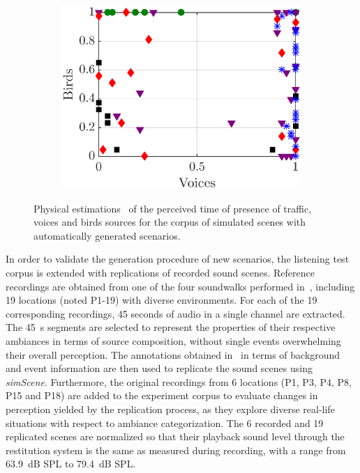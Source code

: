 \documentclass[twocolumn]{article}
\begin{document}
\begin{figure}[th]
\begin{subfigure}[t]{0.33\textwidth}
        \includegraphics[width=\textwidth]{figures/vb_pres.eps}
    \end{subfigure}
    \caption{Physical estimations~\cite{gontier2018} of the perceived time of presence of traffic, voices and birds sources for the corpus of simulated scenes with automatically generated scenarios.}\label{fig:tvb_pres}
\end{figure}

In order to validate the generation procedure of new scenarios, the listening test corpus is extended with replications of recorded sound scenes. Reference recordings are obtained from one of the four soundwalks performed in~\cite{aumond2017}, including 19 locations (noted P1-19) with diverse environments. For each of the 19 corresponding recordings, 45 seconds of audio in a single channel are extracted. The 45~s segments are selected to represent the properties of their respective ambiances in terms of source composition, without single events overwhelming their overall perception. The annotations obtained in~\cite{gloaguen2017} in terms of background and event information are then used to replicate the sound scenes using \textit{simScene}. Furthermore, the original recordings from 6 locations (P1, P3, P4, P8, P15 and P18) are added to the experiment corpus to evaluate changes in perception yielded by the replication process, as they explore diverse real-life situations with respect to ambiance categorization. The 6 recorded and 19 replicated scenes are normalized so that their playback sound level through the restitution system is the same as measured during recording, with a range from 63.9~dB SPL to 79.4~dB SPL.
\end{document}
